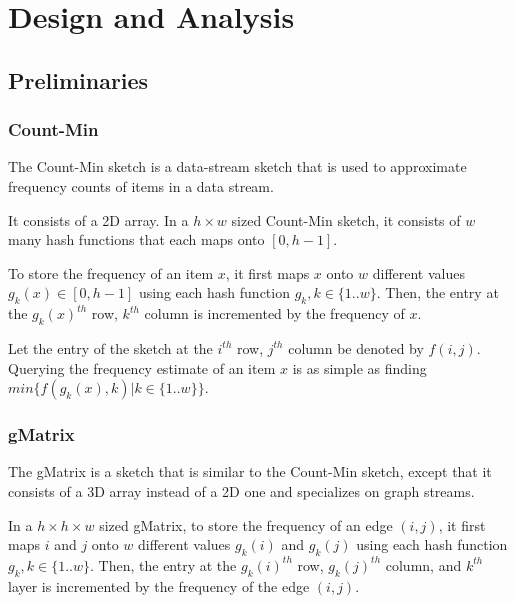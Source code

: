 
\chapter{Design and Analysis}

\ifpdf
    \graphicspath{{Chapter2/Figs/Raster/}{Chapter2/Figs/PDF/}{Chapter2/Figs/}}
\else
    \graphicspath{{Chapter2/Figs/Vector/}{Chapter2/Figs/}}
\fi


\section{Preliminaries}

\subsection{Count-Min}
The Count-Min\cite{cormode2005improved} sketch is a data-stream sketch that is used to approximate frequency counts of items in a data stream.

It consists of a 2D array. In a $h \times w$ sized Count-Min sketch, it consists of $w$ many hash functions that each maps onto $[0,h-1]$.

To store the frequency of an item $x$, it first maps $x$ onto $w$ different values $g_k(x) \in [0,h-1]$ using each hash function $g_k, k \in \{1..w\}$. Then, the entry at the $g_k(x)^{th}$ row, $k^{th}$ column is incremented by the frequency of $x$.

Let the entry of the sketch at the $i^{th}$ row, $j^{th}$ column be denoted by $f(i,j)$. Querying the frequency estimate of an item $x$ is as simple as finding $min\{f(g_k(x),k)|k \in \{1..w\}\}$.

\subsection{gMatrix}
The gMatrix\cite{khan} is a sketch that is similar to the Count-Min sketch, except that it consists of a 3D array instead of a 2D one and specializes on graph streams.

In a $h \times h \times w$ sized gMatrix, to store the frequency of an edge $(i,j)$, it first maps $i$ and $j$ onto $w$ different values $g_k(i)$ and $g_k(j)$ using each hash function $g_k, k \in \{1..w\}$. Then, the entry at the $g_k(i)^{th}$ row, $g_k(j)^{th}$ column, and $k^{th}$ layer is incremented by the frequency of the edge $(i,j)$.

